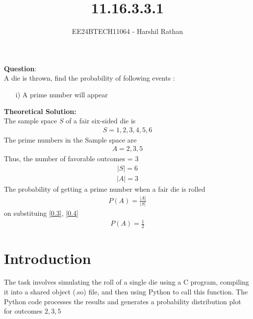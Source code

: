 \documentclass[journal]{IEEEtran}
\begin{document}

\vspace{3cm}

\title{11.16.3.3.1}
\author{EE24BTECH11064 - Harshil Rathan}
 \maketitle
{\let\newpage\relax\maketitle}

\renewcommand{\thefigure}{\theenumi}
\renewcommand{\thetable}{\theenumi}
\setlength{\intextsep}{10pt} %


\renewcommand{\thetable}{\theenumi}
\textbf{Question}:\\
A die is thrown, find the probability of following events : 
\begin{itemize}
    \item[i)] A prime number will appear 
\end{itemize}
\textbf{Theoretical Solution: }\\
The sample space $S$ of a fair six-sided die is
\begin{align}
    S = {1,2,3,4,5,6}
\end{align}
The prime numbers in the Sample space are 
\begin{align}
    A = {2,3,5}
\end{align}
Thus, the number of favorable outcomes = 3 
\begin{align}
    |S| = 6 
    \label{0.3}
\end{align}
\begin{align}
    |A| = 3 
    \label{0.4}
\end{align}
The probability of getting a prime number when a fair die is rolled
\begin{align}
    P(A) = \frac{|A|}{|S|}   
\end{align}
on substituing \ref{0.3}, \ref{0.4}
\begin{align}
    P(A) = \frac{1}{2}
\end{align}
\section*{Introduction}
The task involves simulating the roll of a single die using a C program, compiling it into a shared object (.so) file, and then using Python to call this function. The Python code processes the results and generates a probability distribution plot for outcomes \( 2,3,5 \) \\ 
\end{document}
